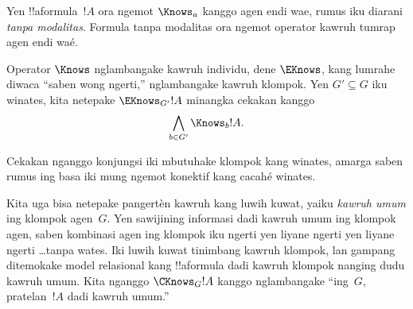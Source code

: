 \documentclass[../../../include/open-logic-section]{subfiles}
\begin{document}
Yen !!a{formula}~$!A$ ora ngemot $\Knows_a$ kanggo agen endi wae,
rumus iku diarani \emph{tanpa modalitas}.
Formula tanpa modalitas ora ngemot operator kawruh tumrap agen endi waé.

\begin{defn}
  Operator $\Knows$ nglambangake kawruh individu, dene $\EKnows$,
  kang lumrahe diwaca ``saben wong ngerti,'' nglambangake kawruh
  klompok. Yen $G' \subseteq G$ iku winates, kita netepake $\EKnows_{G'} !A$
  minangka cekakan kanggo \[\bigwedge_{b \in G'} \Knows_b !A.\]
\end{defn}
Cekakan nganggo konjungsi iki mbutuhake klompok kang winates, amarga saben rumus ing basa iki mung ngemot konektif kang cacahé winates.

Kita uga bisa netepake pangertèn kawruh kang luwih kuwat, yaiku
\emph{kawruh umum} ing klompok agen~$G$. Yen sawijining informasi
dadi kawruh umum ing klompok agen, saben kombinasi agen ing klompok
iku ngerti yen liyane ngerti yen liyane ngerti \dots tanpa wates.
Iki luwih kuwat tinimbang kawruh klompok, lan gampang ditemokake
model relasional kang !!a{formula} dadi kawruh klompok nanging dudu
kawruh umum. Kita nganggo $\CKnows_G !A$ kanggo nglambangake
  ``ing~$G$, pratelan~$!A$ dadi kawruh umum.''
\end{document}
